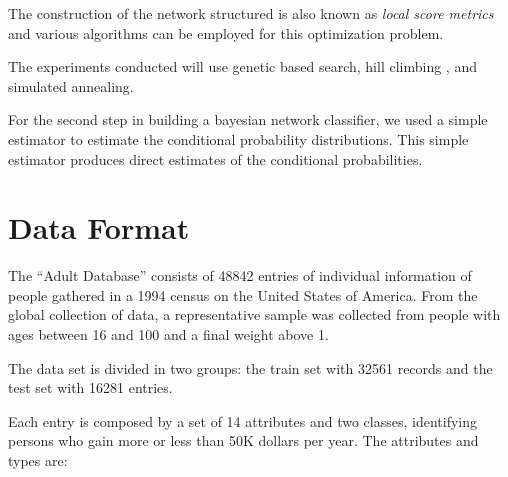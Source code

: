 \documentclass[a4paper]{llncs}
\begin{document}
The construction of the network structured is also known as
\textit{local score metrics} and various algorithms can be employed for this optimization problem.

The experiments conducted will use genetic based search, hill climbing \cite{bayes3}, and simulated annealing.

For the second step in building a bayesian network classifier, we used a
simple estimator to estimate the conditional probability distributions.
This simple estimator produces
direct estimates of the conditional probabilities. \cite{bayes_weka}

\section{Data Format}

The ``Adult Database'' consists of 48842 entries of individual information of 
people gathered in a 1994 census on the United States of America. From the
global collection of data, a representative sample was collected from people
with ages between 16 and 100 and a final weight above 1.

The data set is divided in two groups: the train set with 32561 records and the test set with 16281 entries.

Each entry is composed by a set of 14 attributes and two classes, identifying
persons who gain more or less than 50K dollars per year. The attributes and types are:
\end{document}
